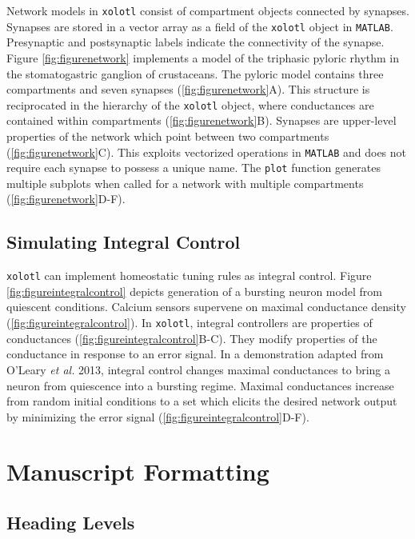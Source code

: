 \documentclass[utf8]{frontiersSCNS} %
\begin{document}
Network models in \texttt{xolotl} consist of compartment objects connected by synapses. Synapses are stored in a vector array as a field of the \texttt{xolotl} object in \texttt{MATLAB}. Presynaptic and postsynaptic labels indicate the connectivity of the synapse. Figure \ref{fig:figurenetwork} implements a model of the triphasic pyloric rhythm in the stomatogastric ganglion of crustaceans. The pyloric model contains three compartments and seven synapses (\ref{fig:figurenetwork}A). This structure is reciprocated in the hierarchy of the \texttt{xolotl} object, where conductances are contained within compartments (\ref{fig:figurenetwork}B). Synapses are upper-level properties of the network which point between two compartments (\ref{fig:figurenetwork}C). This exploits vectorized operations in \texttt{MATLAB} and does not require each synapse to possess a unique name. The \texttt{plot} function generates multiple subplots when called for a network with multiple compartments (\ref{fig:figurenetwork}D-F).

\subsection{Simulating Integral Control}

\texttt{xolotl} can implement homeostatic tuning rules as integral control. Figure \ref{fig:figureintegralcontrol} depicts generation of a bursting neuron model from quiescent conditions. Calcium sensors supervene on maximal conductance density (\ref{fig:figureintegralcontrol}). In \texttt{xolotl}, integral controllers are properties of conductances (\ref{fig:figureintegralcontrol}B-C). They modify properties of the conductance in response to an error signal. In a demonstration adapted from O'Leary \textit{et al.} 2013, integral control changes maximal conductances to bring a neuron from quiescence into a bursting regime. Maximal conductances increase from random initial conditions to a set which elicits the desired network output by minimizing the error signal (\ref{fig:figureintegralcontrol}D-F).

\section{Manuscript Formatting}

\subsection{Heading Levels}
\end{document}
